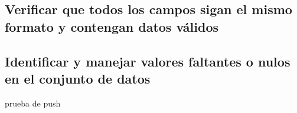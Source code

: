 \subsection{Verificar que todos los campos sigan el mismo formato y contengan datos válidos}

\subsection{Identificar y manejar valores faltantes o nulos en el conjunto de datos}

prueba de push